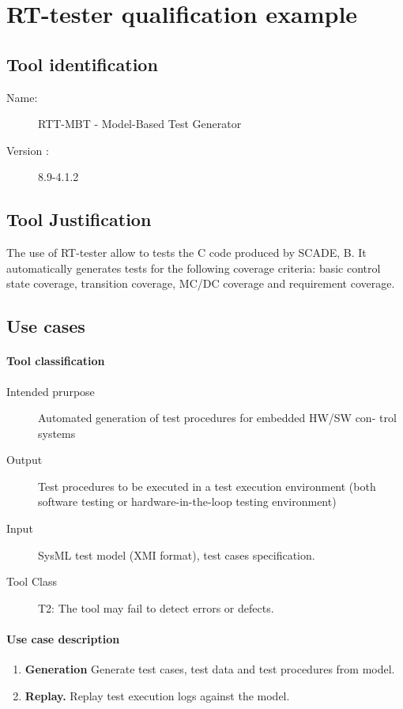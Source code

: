 \section{RT-tester qualification example}
\subsection{Tool identification}
\begin{description}
\item[Name:]  RTT-MBT - Model-Based Test Generator
\item[Version :]  8.9-4.1.2
\end{description}
\subsection{Tool Justification}
The use of RT-tester allow to tests the C code produced by SCADE,
B. It automatically generates tests for the following coverage
criteria:  basic control state coverage, transition coverage, MC/DC
coverage and requirement coverage.

\subsection{Use cases}
\paragraph{Tool classification}
\begin{description}
\item[Intended prurpose] Automated generation of test procedures for embedded HW/SW con-
trol systems
\item[Output] Test procedures to be executed in a test execution environment (both software
testing or hardware-in-the-loop testing environment) 
\item[Input] SysML test model (XMI format), test cases specification.
\item[Tool Class] T2: The tool may fail to detect errors or defects.
\end{description}
\paragraph{Use case description}
\begin{enumerate} 
\item {\bf Generation} Generate test cases, test data and test procedures from model.
\item {\bf Replay.} Replay test execution logs against the model.
\end{enumerate}

